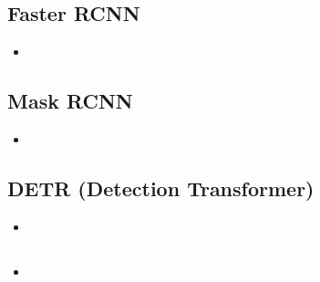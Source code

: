 \documentclass[a4, 12pt]{article}
\begin{document}
\subsection{Faster RCNN}
\begin{itemize}
    \item 
\end{itemize}

\subsection{Mask RCNN}
\begin{itemize}
    \item 
\end{itemize}

\subsection{DETR (Detection Transformer)}
\begin{itemize}
    \item 
\end{itemize}

\subsection{}
\begin{itemize}
    \item 
\end{itemize}



\end{document}
